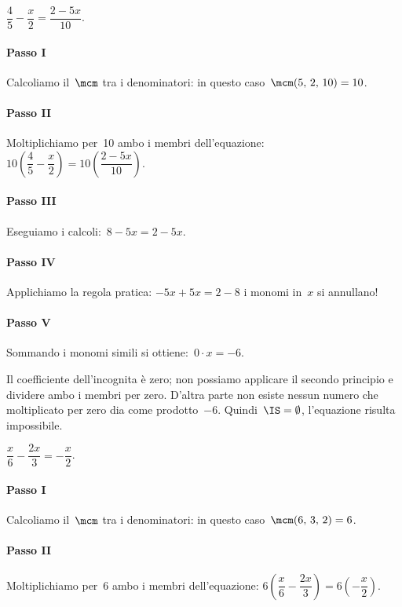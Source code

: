 \begin{exrig}\vspace{1.10ex}
 \begin{esempio}
 $\dfrac{4}{5}-\dfrac{x}{2}=\dfrac{2-5x}{10}$.

\paragraph{Passo I} Calcoliamo il~$\mcm$ tra i denominatori: in questo
caso~$\mcm(5\text{,~}2\text{,~}10) = 10$.

\paragraph{Passo II} Moltiplichiamo per~10 ambo i membri
dell'equazione:
$10\left(\dfrac{4}{5}-\dfrac{x}{2}\right)=10\left(\dfrac{2-5x}{10}\right)$.

\paragraph{Passo III} Eseguiamo i calcoli:~$8-5x=2-5x$.

\paragraph{Passo IV} Applichiamo la regola pratica:
$-5x+5x=2-8$ i monomi in~$x$ si annullano!

\paragraph{Passo V} Sommando i monomi simili si ottiene:~$0\cdot x=-6$.

Il coefficiente dell'incognita è zero; non possiamo
applicare il secondo principio e dividere ambo i membri per zero.
D'altra parte non esiste nessun numero che moltiplicato
per zero dia come prodotto~$-6$. Quindi~$\IS =\emptyset $,
l'equazione risulta impossibile.
 \end{esempio}

 \begin{esempio}
$\dfrac{x}{6}-\dfrac{2x}{3}=-{\dfrac{x}{2}}$.

\paragraph{Passo I} Calcoliamo il~$\mcm$ tra i denominatori: in questo
caso~$\mcm(6\text{,~}3\text{,~}2) = 6$.

\paragraph{Passo II} Moltiplichiamo per~6 ambo i membri
dell'equazione:
$6\left(\dfrac{x}{6}-\dfrac{2x}{3}\right)=6\left(-{\dfrac{x}{2}}\right)$.


\end{esempio}
\end{exrig}
